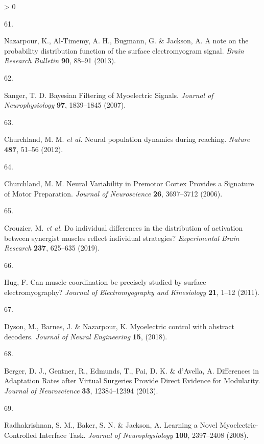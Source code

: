 \documentclass[
  a4paper,
]{article}
\newlength{\cslhangindent}
\newlength{\csllabelwidth}
\newenvironment{CSLReferences}[2] %
 {%
  \setlength{\parindent}{0pt}
  \ifodd #1 \everypar{\setlength{\hangindent}{\cslhangindent}}\ignorespaces\fi
  \ifnum #2 > 0
  \setlength{\parskip}{#2\baselineskip}
  \fi
 }%
 {}
\newcommand{\CSLLeftMargin}[1]{\parbox[t]{\csllabelwidth}{#1}}
\newcommand{\CSLRightInline}[1]{\parbox[t]{\linewidth - \csllabelwidth}{#1}\break}
\begin{document}
\begin{CSLReferences}{0}{0}
\leavevmode\hypertarget{ref-nazarpourNoteProbabilityDistribution2013}{}%
\CSLLeftMargin{61. }
\CSLRightInline{Nazarpour, K., Al-Timemy, A. H., Bugmann, G. \& Jackson,
A. A note on the probability distribution function of the surface
electromyogram signal. \emph{Brain Research Bulletin} \textbf{90},
88--91 (2013).}

\leavevmode\hypertarget{ref-sangerBayesianFilteringMyoelectric2007}{}%
\CSLLeftMargin{62. }
\CSLRightInline{Sanger, T. D. Bayesian {Filtering} of {Myoelectric
Signals}. \emph{Journal of Neurophysiology} \textbf{97}, 1839--1845
(2007).}

\leavevmode\hypertarget{ref-churchlandNeuralPopulationDynamics2012a}{}%
\CSLLeftMargin{63. }
\CSLRightInline{Churchland, M. M. \emph{et al.} Neural population
dynamics during reaching. \emph{Nature} \textbf{487}, 51--56 (2012).}

\leavevmode\hypertarget{ref-churchlandNeuralVariabilityPremotor2006}{}%
\CSLLeftMargin{64. }
\CSLRightInline{Churchland, M. M. Neural {Variability} in {Premotor
Cortex Provides} a {Signature} of {Motor Preparation}. \emph{Journal of
Neuroscience} \textbf{26}, 3697--3712 (2006).}

\leavevmode\hypertarget{ref-crouzierIndividualDifferencesDistribution2019}{}%
\CSLLeftMargin{65. }
\CSLRightInline{Crouzier, M. \emph{et al.} Do individual differences in
the distribution of activation between synergist muscles reflect
individual strategies? \emph{Experimental Brain Research} \textbf{237},
625--635 (2019).}

\leavevmode\hypertarget{ref-Hug2011}{}%
\CSLLeftMargin{66. }
\CSLRightInline{Hug, F. Can muscle coordination be precisely studied by
surface electromyography? \emph{Journal of Electromyography and
Kinesiology} \textbf{21}, 1--12 (2011).}

\leavevmode\hypertarget{ref-Dyson2018}{}%
\CSLLeftMargin{67. }
\CSLRightInline{Dyson, M., Barnes, J. \& Nazarpour, K. Myoelectric
control with abstract decoders. \emph{Journal of Neural Engineering}
\textbf{15}, (2018).}

\leavevmode\hypertarget{ref-BergerDifferencesInAdaptationRates2013a}{}%
\CSLLeftMargin{68. }
\CSLRightInline{Berger, D. J., Gentner, R., Edmunds, T., Pai, D. K. \&
d'Avella, A. Differences in {Adaptation Rates} after {Virtual Surgeries
Provide Direct Evidence} for {Modularity}. \emph{Journal of
Neuroscience} \textbf{33}, 12384--12394 (2013).}

\leavevmode\hypertarget{ref-radhakrishnanLearningNovelMyoelectricControlled2008}{}%
\CSLLeftMargin{69. }
\CSLRightInline{Radhakrishnan, S. M., Baker, S. N. \& Jackson, A.
Learning a {Novel Myoelectric}-{Controlled Interface Task}.
\emph{Journal of Neurophysiology} \textbf{100}, 2397--2408 (2008).}


\end{CSLReferences}
\end{document}
